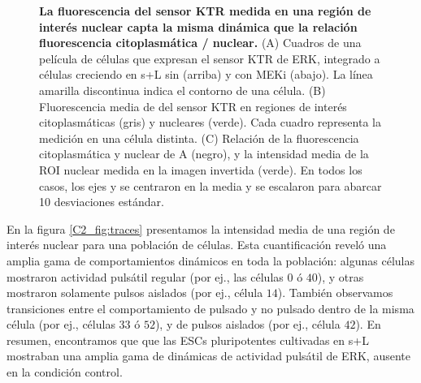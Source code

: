 \documentclass[./main.tex]{subfiles}
\begin{document}
\begin{figure}
    \caption{\textbf{La fluorescencia del sensor KTR medida en una región de interés nuclear capta la misma dinámica que la relación fluorescencia citoplasmática / nuclear.} (A) Cuadros de una película de células que expresan el sensor KTR de ERK, integrado a células creciendo en s+L sin (arriba) y con MEKi (abajo). La línea amarilla discontinua indica el contorno de una célula. (B) Fluorescencia media de del sensor KTR en regiones de interés citoplasmáticas (gris) y nucleares (verde). Cada cuadro representa la medición en una célula distinta. (C) Relación de la fluorescencia citoplasmática y nuclear de A (negro), y la intensidad media de la ROI nuclear medida en la imagen invertida (verde). En todos los casos, los ejes y se centraron en la media y se escalaron para abarcar 10 desviaciones estándar.}
    \label{C2_fig:citoplasma_nucleo}
\end{figure}


En la figura \ref{C2_fig:traces} presentamos la intensidad media de una región de interés nuclear para una población de células. Esta cuantificación reveló una amplia gama de comportamientos dinámicos en toda la población: algunas células mostraron actividad pulsátil regular (por ej., las células $0$ ó $40$), y otras mostraron solamente pulsos aislados (por ej., célula $14$). También observamos transiciones entre el comportamiento de pulsado y no pulsado dentro de la misma célula (por ej., células $33$ ó $52$), y de pulsos aislados (por ej., célula $42$). En resumen, encontramos que que las ESCs pluripotentes cultivadas en s+L mostraban una amplia gama de dinámicas de actividad pulsátil de ERK, ausente en la condición control.


\end{document}
